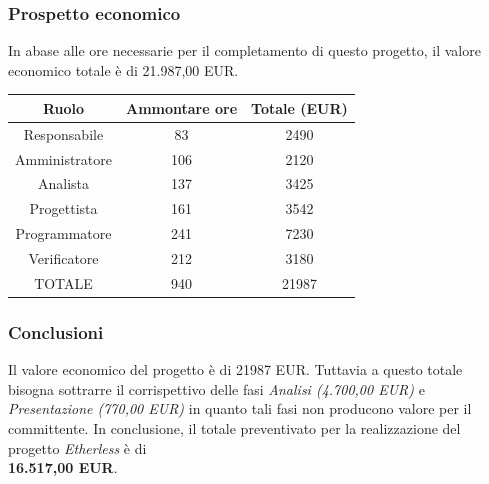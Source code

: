 \subsubsection{Prospetto economico}
In abase alle ore necessarie per il completamento di questo progetto, il valore economico totale è di 21.987,00 EUR.
\begin{center}
\begin{tabular}{ |c|c|c|  }
 \hline
 Ruolo 		& Ammontare ore 	& Totale (EUR)\\
 	\hline
 \hline
 	Responsabile	& 83 	& 2490\\
	Amministratore	& 106		& 2120\\
	Analista		& 137 		& 3425\\
	Progettista		& 161		& 3542\\
	Programmatore	& 241		& 7230\\
	Verificatore	& 212 	& 3180\\
 \hline\hline
 TOTALE		& 940		& 21987\\
  \hline
\end{tabular}
\end{center}

\subsubsection{Conclusioni}
Il valore economico del progetto è di 21987 EUR. Tuttavia a questo totale bisogna sottrarre il corrispettivo delle fasi \textit{Analisi (4.700,00 EUR)} e \textit{Presentazione (770,00 EUR)} in quanto tali fasi non producono valore per il committente.
\newline
\newline
In conclusione, il totale preventivato per la realizzazione del progetto \textit{Etherless} è di\\ \textbf{16.517,00 EUR}.